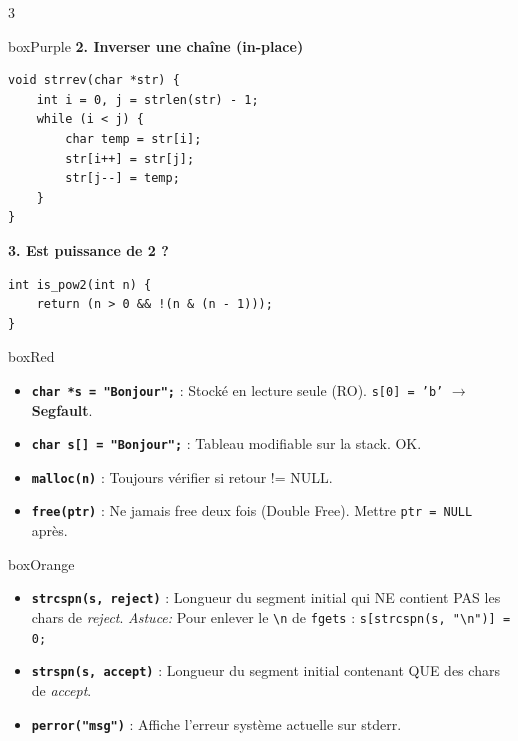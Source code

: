 \documentclass[10pt,landscape,a4paper]{article}
\begin{document}
\begin{multicols*}{3}
\begin{mybox}{boxPurple}
    \textbf{2. Inverser une chaîne (in-place)}
    \begin{lstlisting}
void strrev(char *str) {
    int i = 0, j = strlen(str) - 1;
    while (i < j) {
        char temp = str[i];
        str[i++] = str[j];
        str[j--] = temp;
    }
}
    \end{lstlisting}
    
    \textbf{3. Est puissance de 2 ?}
    \begin{lstlisting}
int is_pow2(int n) {
    return (n > 0 && !(n & (n - 1)));
}
    \end{lstlisting}
\end{mybox}

\begin{mybox}{boxRed}
    \begin{itemize}[leftmargin=*, noitemsep]
        \item \textbf{\texttt{char *s = "Bonjour";}} :
            Stocké en lecture seule (RO). \texttt{s[0] = 'b'} $\rightarrow$ \textbf{Segfault}.
        \item \textbf{\texttt{char s[] = "Bonjour";}} :
            Tableau modifiable sur la stack. OK.
        \item \textbf{\texttt{malloc(n)}} :
            Toujours vérifier si retour != NULL.
        \item \textbf{\texttt{free(ptr)}} :
            Ne jamais free deux fois (Double Free). Mettre \texttt{ptr = NULL} après.
    \end{itemize}
\end{mybox}

\begin{mybox}{boxOrange}
    \begin{itemize}[leftmargin=*, noitemsep]
        \item \textbf{\texttt{strcspn(s, reject)}} : Longueur du segment initial qui NE contient PAS les chars de \textit{reject}.
            \textit{Astuce:} Pour enlever le \texttt{\textbackslash n} de \texttt{fgets} :
            \texttt{s[strcspn(s, "\textbackslash n")] = 0;}
        \item \textbf{\texttt{strspn(s, accept)}} : Longueur du segment initial contenant QUE des chars de \textit{accept}.
        \item \textbf{\texttt{perror("msg")}} : Affiche l'erreur système actuelle sur stderr.
    \end{itemize}
\end{mybox}

\end{multicols*}
\end{document}
